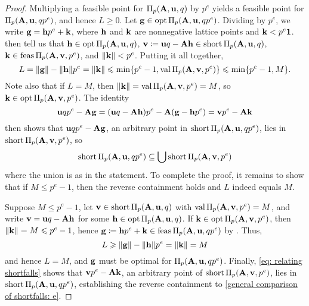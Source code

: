 \documentclass{article}
\begin{document}
\begin{proof}
   Multiplying a feasible point for $\Pi_p(\mathbf{A}, \mathbf{u}, q)$ by $p^e$ yields a feasible point for $\Pi_p(\mathbf{A}, \mathbf{u}, qp^e)$, and hence $L\geq 0$.
   Let $\mathbf{g} \in \operatorname{opt} \Pi_p(\mathbf{A}, \mathbf{u}, qp^e)$.
   Dividing by $p^e$, we write $\mathbf{g} = \mathbf{h} p^e + \mathbf{k}$,
   where $\mathbf{h}$ and $\mathbf{k}$ are nonnegative lattice points and $\mathbf{k} < p^e \mathbf{1}$.
    then tell us that $\mathbf{h} \in \operatorname{opt} \Pi_p(\mathbf{A},\mathbf{u},q)$, $\mathbf{v} \coloneqq \mathbf{u}q - \mathbf{A} \mathbf{h} \in \operatorname{short} \Pi_p(\mathbf{A},\mathbf{u},q)$, $\mathbf{k} \in \operatorname{feas} \Pi_p(\mathbf{A},\mathbf{v},p^e)$, and $\| \mathbf{k} \| < p^e$.
   Putting it all together, 
   \[ L = \| \mathbf{g} \|-\| \mathbf{h} \|p^e = \| \mathbf{k} \| \leqslant \min \{ p^e-1, \operatorname{val} \Pi_p(\mathbf{A}, \mathbf{v}, p^e) \} \leqslant \min \{ p^e-1, M \}.\]
   Note also that if $L=M$, then $\| \mathbf{k} \| = \operatorname{val} \Pi_p(\mathbf{A},\mathbf{v},p^e) = M$, so $\mathbf{k} \in \operatorname{opt}\Pi_p(\mathbf{A},\mathbf{v},p^e)$.
   The identity
   \begin{equation}
      \label{eq: relating shortfalls}
      \mathbf{u}qp^e-\mathbf{A} \mathbf{g} =
      (\mathbf{u}q-\mathbf{A}\mathbf{h})p^e-\mathbf{A}(\mathbf{g}-\mathbf{h}p^e) = 
      \mathbf{v}p^e-\mathbf{A}\mathbf{k}
   \end{equation}
   then shows that $\mathbf{u}qp^e-\mathbf{A} \mathbf{g}$, an arbitrary point in $\operatorname{short}\Pi_p(\mathbf{A}, \mathbf{u},q p^e)$, lies in $\operatorname{short} \Pi_p(\mathbf{A}, \mathbf{v},p^e)$, so
   \begin{equation}
      \label{general comparison of shortfalls: e}
      \operatorname{short} \Pi_p(\mathbf{A}, \mathbf{u}, qp^e) \subseteq \bigcup \operatorname{short} \Pi_p(\mathbf{A}, \mathbf{v}, p^e)
   \end{equation}
   where the union is as in the statement.
   To complete the proof, it remains to show that if $M\le p^e-1$, then the reverse containment holds and $L$ indeed equals  $M$.
   
   Suppose $M \le p^e-1$, let $\mathbf{v} \in \operatorname{short} \Pi_p(\mathbf{A}, \mathbf{u}, q)$ with $\operatorname{val}\Pi_p(\mathbf{A},\mathbf{v},p^e)=M$, and write $\mathbf{v} = \mathbf{u}q - \mathbf{A} \mathbf{h}$ for some $\mathbf{h} \in \operatorname{opt} \Pi_p(\mathbf{A}, \mathbf{u}, q)$.
   If $\mathbf{k} \in \operatorname{opt} \Pi_p(\mathbf{A}, \mathbf{v}, p^e)$, then $\| \mathbf{k} \| = M \leqslant p^e-1$, hence  $\mathbf{g} \coloneqq \mathbf{h} p^e + \mathbf{k} \in \operatorname{feas} \Pi_p(\mathbf{A},\mathbf{u},qp^e)$ by .
   Thus,
   \[ L \geqslant \| \mathbf{g} \| - \| \mathbf{h} \|p^e = \| \mathbf{k} \| = M \]
   and hence $L=M$, and $\mathbf{g}$ must be optimal for $\Pi_p(\mathbf{A},\mathbf{u},qp^e)$.
   Finally, \eqref{eq: relating shortfalls} shows that $\mathbf{v}p^e - \mathbf{A}\mathbf{k}$, an arbitrary point of $\operatorname{short} \Pi_p(\mathbf{A},\mathbf{v},p^e)$, lies in $\operatorname{short}\Pi_p(\mathbf{A},\mathbf{u},qp^e)$, establishing the reverse containment to \eqref{general comparison of shortfalls: e}.
\end{proof}
\end{document}
